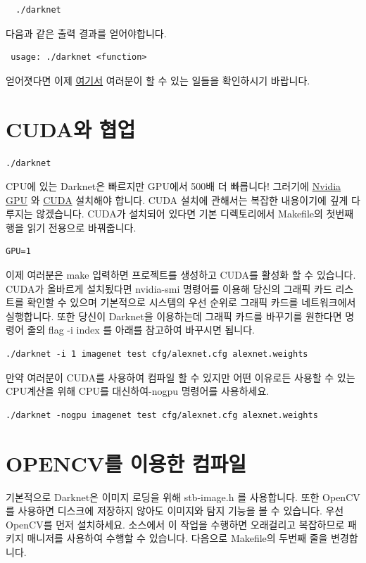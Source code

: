 \documentclass{article}
\begin{document}
\begin{lstlisting}
  ./darknet 
\end{lstlisting}
다음과 같은 출력 결과를 얻어야합니다.
\begin{lstlisting}
 usage: ./darknet <function>

\end{lstlisting}
얻어졋다면 이제 \href{https://pjreddie.com/darknet/}{여기서} 여러분이 
할 수 있는 일들을 확인하시기 바랍니다.

\section{CUDA와 협업}
\begin{lstlisting}
./darknet 
\end{lstlisting}
CPU에 있는 Darknet은 빠르지만 GPU에서 500배 더 빠릅니다! 그러기에  \href{https://developer.nvidia.com/cuda-gpus}{Nvidia GPU} 와 \href{https://developer.nvidia.com/cuda-downloads}{CUDA} 설치해야 합니다. 
CUDA 설치에 관해서는 복잡한 내용이기에 깊게 다루지는 않겠습니다.
\newline CUDA가 설치되어 있다면 기본 디렉토리에서 Makefile의 첫번째 행을 읽기 전용으로 바꿔줍니다.
\begin{lstlisting}
GPU=1 
\end{lstlisting}
이제 여러분은 make 입력하면 프로젝트를 생성하고 CUDA를 활성화 할 수 있습니다. 
CUDA가 올바르게 설치됬다면 nvidia-smi 명령어를 이용해 당신의 그래픽 카드 리스트를 확인할 수 있으며 기본적으로 시스템의 우선 순위로 그래픽 카드를 네트워크에서 실행합니다. 
또한 당신이 Darknet을 이용하는데 그래픽 카드를 바꾸기를 원한다면
명령어 줄의 flag -i \textlangle index \textrangle  를 아래를 참고하여 바꾸시면 됩니다.

\begin{lstlisting}
./darknet -i 1 imagenet test cfg/alexnet.cfg alexnet.weights
\end{lstlisting}
만약 여러분이 CUDA를 사용하여 컴파일 할 수 있지만 어떤 이유로든 
사용할 수 있는 CPU계산을 위해 CPU를 대신하여-nogpu 명령어를 사용하세요.   
 
\begin{lstlisting}
./darknet -nogpu imagenet test cfg/alexnet.cfg alexnet.weights 

\end{lstlisting}
   
\section{OPENCV를 이용한 컴파일}
기본적으로 Darknet은 이미지 로딩을 위해 stb-image.h 를 사용합니다. 또한 OpenCV를 사용하면 디스크에 저장하지 않아도 이미지와 탐지 기능을 볼 수 있습니다. 우선 OpenCV를 먼저 설치하세요.
소스에서 이 작업을 수행하면 오래걸리고 복잡하므로 패키지 매니저를 사용하여 수행할 수 있습니다.
\newline 다음으로 Makefile의 두번째 줄을 변경합니다.
\end{document}
